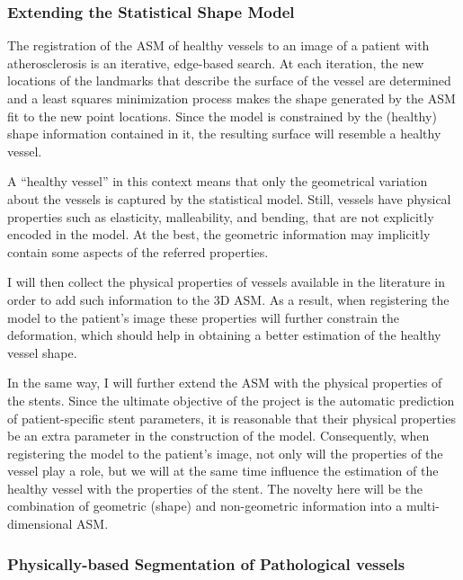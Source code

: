 \subsubsection{Extending the Statistical Shape Model}

\challenge
The registration of the ASM of healthy vessels to an image of a patient with atherosclerosis is an iterative, edge-based search. At each iteration, the new locations of the landmarks that describe the surface of the vessel are determined and a least squares minimization process makes the shape generated by the ASM fit to the new point locations. Since the model is constrained by the (healthy) shape information contained in it, the resulting surface will resemble a healthy vessel.

A ``healthy vessel'' in this context means that only the geometrical variation about the vessels is captured by the statistical model. Still, vessels have physical properties such as elasticity, malleability, and bending, that are not explicitly encoded in the model. At the best, the geometric information may implicitly contain some aspects of the referred properties. 

\approach
I will then collect the physical properties of vessels available in the literature \citep{ZAHN-11d,BOUS-09c,BOUS-08c,SULA-08a,Oubel,zhang:1294,Balocco} in order to add such information to the 3D ASM. As a result, when registering the model to the patient's image these properties will further constrain the deformation, which should help in obtaining a better estimation of the healthy vessel shape. 

In the same way, I will further extend the ASM with the physical properties of the stents. Since the ultimate objective of the project is the automatic prediction of patient-specific stent parameters, it is reasonable that their physical properties be an extra parameter in the construction of the model. Consequently, when registering the model to the patient's image, not only will the properties of the vessel play a role, but we will at the same time influence the estimation of the healthy vessel with the properties of the stent. The novelty here will be the combination of geometric (shape) and non-geometric information into a multi-dimensional ASM. 

\subsubsection{Physically-based Segmentation of Pathological vessels}

